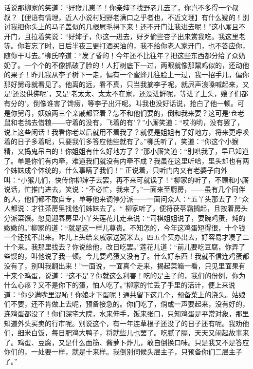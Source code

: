\documentclass[12pt,oneside]{book}
\begin{document}
话说那柳家的笑道：“好猴儿崽子！你亲婶子找野老儿去了，你岂不多得一个叔叔？【俚语有情理，近人小说村妇野老满口之乎者也，不近文理】有什么疑的！别讨我把你头上的马子盖似的几根屄毛挦下来！还不开门让我进去呢！”这小厮且不开门，且拉着笑说：“好婶子，你这一进去，好歹偷些杏子出来赏我吃。我这里老等。你若忘了时，日后半夜三更打酒买油的，我不给你老人家开门，也不答应你，随你干叫去。”柳氏啐道︰“发了昏的！今年还不比往年？把这些东西都分给了众奶奶了。一个个的不像抓破了脸的！人打树底下一过，两眼就像那黧鸡似的，还动他的果子！昨儿我从李子树下一走，偏有一个蜜蜂儿往脸上一过，我一招手儿，偏你那好舅母就看见了。他离的远，看不真，只当我摘李子呢，就屄声浪嗓喊起来，又是‘还没供佛呢’，又是‘老太太、太太不在家，还没进鲜呢，等进了上头，嫂子们都有分的’，倒像谁害了馋痨，等李子出汗呢。叫我也没好话说，抢白了他一顿。可是你舅母，姨娘两三个亲戚都管着？怎不和他们要的，倒和我来要？这可是‘仓老鼠和老鸹去借粮――守着的没有，飞着的有’？”小厮笑道：“哎哟哟，没有罢了，说上这些闲话！我看你老以后就用不着我了？就便是姐姐有了好地方，将来更呼唤着的日子多着呢，只要我们多答应他些就有了。”柳氏听了，笑道：“你这个小猴精，又捣鬼吊白的！你姐姐有什么好地方了？”那小厮笑道：“别哄我了，早已知道了。单是你们有内牵，难道我们就没有内牵不成？我虽在这里听哈，里头却也有两个姊妹成个体统的，什么事瞒了我们！”
正说着，只听门内又有老婆子向外叫：“小猴儿们，快传你柳婶子去罢，再不来可就误了！”柳家的听了，不顾和小厮说话，忙推门进去，笑说：“不必忙，我来了。”一面来至厨房，――虽有几个同伴的人，他们都不敢自专，单等他来调停分派――一面问众人：“五丫头那去了？”众人都说︰才往茶房里找他们姊妹去了。“
柳家听了，便将茯苓霜搁起，且按着房头分派菜馔。忽见迎春房里小丫头莲花儿走来说：“司棋姐姐说了，要碗鸡蛋，炖的嫩嫩的。”柳家的道：“就是这一样儿尊贵。不知怎的，今年这鸡蛋短得很，十个钱一个还找不出来。昨儿上头给亲戚家送粥米去，四五个买办出去，好容易才凑了二十个来。我那里找去？你说给他，改日吃罢。”莲花儿道：“前儿要吃豆腐，你弄了些馊的，叫他说了我一顿。今儿要鸡蛋又没有了。什么好东西！我就不信连鸡蛋都没有了，别叫我翻出来！”一面说，一面真个走来，揭起菜箱一看，只见里面果有十来个鸡蛋，说道：“这不是？你就这么利害！吃的是主子的，我们的份例，你为什么心疼？又不是你下的蛋，怕人吃了。”柳家的忙丢了手里的活计，便上来说道：“你少满嘴里混吣！你娘才下蛋呢！通共留下这几个，预备菜上的浇头。姑娘们不要，还不肯做上去呢，预备接急的。你们吃了，倘或一声要起来，没有好的，连鸡蛋都没了！你们深宅大院，水来伸手，饭来张口，只知鸡蛋是平常对象，那里知道外头买卖的行市呢。别说这个，有一年连草根子还没了的日子还有呢。我劝他们，细米白饭，每日肥鸡大鸭子，将就些儿也罢了。吃腻了膈，天天又闹起故事来了。鸡蛋、豆腐，又是什么面筋、酱萝卜炸儿，敢自倒换口味。只是我又不是答应你们的，一处要一样，就是十来样。我倒别伺候头层主子，只预备你们二层主子了。”
\end{document}
